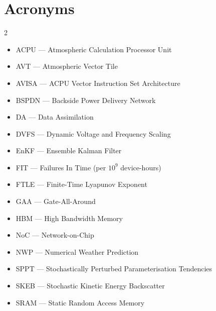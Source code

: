\clearpage
\section{Acronyms}\label{app:acronyms}

\begin{multicols}{2}\small
\begin{itemize}[leftmargin=0pt,itemsep=0pt]
\item ACPU --- Atmospheric Calculation Processor Unit
\item AVT --- Atmospheric Vector Tile
\item AVISA --- ACPU Vector Instruction Set Architecture
\item BSPDN --- Backside Power Delivery Network
\item DA --- Data Assimilation
\item DVFS --- Dynamic Voltage and Frequency Scaling
\item EnKF --- Ensemble Kalman Filter
\item FIT --- Failures In Time (per $10^9$ device-hours)
\item FTLE --- Finite-Time Lyapunov Exponent
\item GAA --- Gate-All-Around
\item HBM --- High Bandwidth Memory
\item NoC --- Network-on-Chip
\item NWP --- Numerical Weather Prediction
\item SPPT --- Stochastically Perturbed Parameterisation Tendencies
\item SKEB --- Stochastic Kinetic Energy Backscatter
\item SRAM --- Static Random Access Memory
\end{itemize}
\end{multicols}
